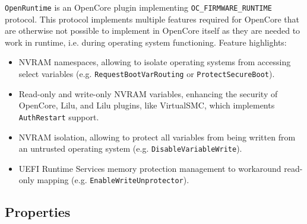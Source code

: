 \documentclass[]{article}
\begin{document}
\texttt{OpenRuntime} is an OpenCore plugin implementing \texttt{OC\_FIRMWARE\_RUNTIME} protocol.
This protocol implements multiple features required for OpenCore that are otherwise not possible
to implement in OpenCore itself as they are needed to work in runtime, i.e. during operating system
functioning. Feature highlights:

\begin{itemize}
  \item NVRAM namespaces, allowing to isolate operating systems from accessing select
  variables (e.g. \texttt{RequestBootVarRouting} or \texttt{ProtectSecureBoot}).
  \item Read-only and write-only NVRAM variables, enhancing the security of OpenCore,
  Lilu, and Lilu plugins, like VirtualSMC, which implements \texttt{AuthRestart} support.
  \item NVRAM isolation, allowing to protect all variables from being written from
  an untrusted operating system (e.g. \texttt{DisableVariableWrite}).
  \item UEFI Runtime Services memory protection management to workaround read-only
  mapping (e.g. \texttt{EnableWriteUnprotector}).
\end{itemize}

\subsection{Properties}\label{uefiprops}
\end{document}
